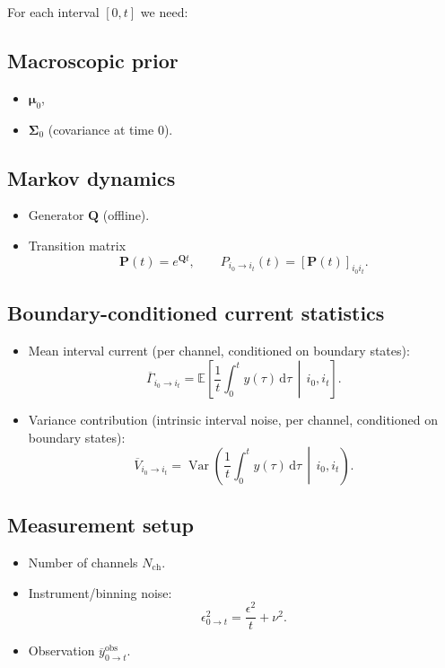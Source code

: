 \documentclass[11pt]{article}
\begin{document}
For each interval \([0,t]\) we need:

\subsection{Macroscopic prior}

\begin{itemize}
  \item \(\boldsymbol{\mu}_0\),
  \item \(\boldsymbol{\Sigma}_0\) (covariance at time \(0\)).
\end{itemize}

\subsection{Markov dynamics}

\begin{itemize}
  \item Generator \(\mathbf{Q}\) (offline).
  \item Transition matrix
  \[
    \mathbf{P}(t) = e^{\mathbf{Q}t},\qquad
    P_{i_0\to i_t}(t) = [\mathbf{P}(t)]_{i_0 i_t}.
  \]
\end{itemize}

\subsection{Boundary-conditioned current statistics}

\begin{itemize}
  \item Mean interval current (per channel, conditioned on boundary states):
  \[
    \overline{\Gamma}_{i_0\to i_t}
    =
    \mathbb{E}\!\left[
      \frac{1}{t}\int_0 ^t y(\tau)\,\mathrm{d}\tau
      \,\middle|\,
      i_0,i_t
    \right].
  \]
  \item Variance contribution (intrinsic interval noise, per channel, conditioned on boundary states):
  \[
    \overline{V}_{i_0\to i_t}
    =
    \operatorname{Var}\!\left(
      \frac{1}{t}\int_0 ^t y(\tau)\,\mathrm{d}\tau
      \,\middle|\,
      i_0,i_t
    \right).
  \]
\end{itemize}

\subsection{Measurement setup}

\begin{itemize}
  \item Number of channels \(N_{\text{ch}}\).
  \item Instrument/binning noise:
  \[
    \epsilon^2_{0\to t} = \frac{\epsilon^2}{t} + \nu^2.
  \]
  \item Observation \(\overline{y}^{\text{obs}}_{0\to t}\).
\end{itemize}
\end{document}
